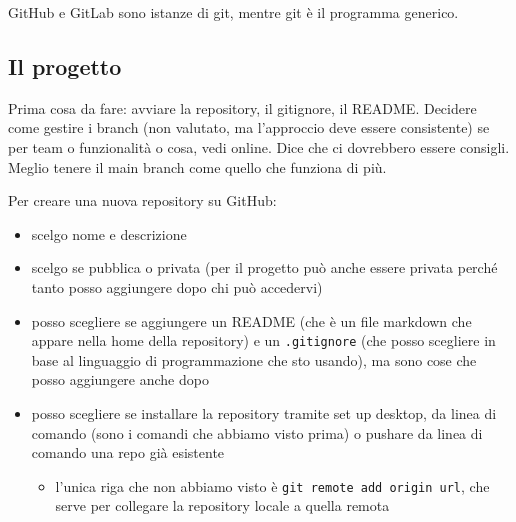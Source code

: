\par GitHub e GitLab sono istanze di git, mentre git è il programma generico.

\subsection{Il progetto}
\par Prima cosa da fare: avviare la repository, il gitignore, il README. Decidere come gestire i branch (non valutato, ma l'approccio deve essere consistente) se per team o funzionalità o cosa, vedi online. Dice che ci dovrebbero essere consigli. Meglio tenere il main branch come quello che funziona di più.
\par Per creare una nuova repository su GitHub:
\begin{itemize}
    \item scelgo nome e descrizione
    \item scelgo se pubblica o privata (per il progetto può anche essere privata perché tanto posso aggiungere dopo chi può accedervi)
    \item posso scegliere se aggiungere un README (che è un file markdown che appare nella home della repository) e un \texttt{.gitignore} (che posso scegliere in base al linguaggio di programmazione che sto usando), ma sono cose che posso aggiungere anche dopo
    \item posso scegliere se installare la repository tramite set up desktop, da linea di comando (sono i comandi che abbiamo visto prima) o pushare da linea di comando una repo già esistente
    \begin{itemize}
        \item l'unica riga che non abbiamo visto è \texttt{git remote add origin url}, che serve per collegare la repository locale a quella remota
    \end{itemize}
\end{itemize}